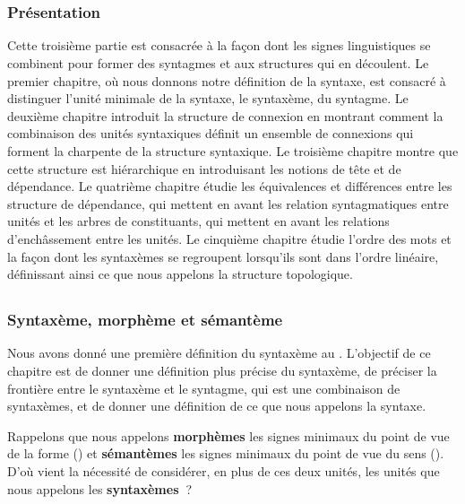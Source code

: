 \part{}\label{sec:3}

\section*{Présentation}

Cette troisième partie est consacrée à la façon dont les signes linguistiques se combinent pour former des syntagmes et aux structures qui en découlent. Le premier chapitre, où nous donnons notre définition de la syntaxe, est consacré à distinguer l’unité minimale de la syntaxe, le syntaxème, du syntagme. Le deuxième chapitre introduit la structure de connexion en montrant comment la combinaison des unités syntaxiques définit un ensemble de connexions qui forment la charpente de la structure syntaxique. Le troisième chapitre montre que cette structure est hiérarchique en introduisant les notions de tête et de dépendance. Le quatrième chapitre étudie les équivalences et différences entre les structure de dépendance, qui mettent en avant les relation syntagmatiques entre unités et les arbres de constituants, qui mettent en avant les relations d’enchâssement entre les unités. Le cinquième chapitre étudie l’ordre des mots et la façon dont les syntaxèmes se regroupent lorsqu’ils sont dans l’ordre linéaire, définissant ainsi ce que nous appelons la structure topologique.

\chapter{}\label{sec:3.1}

\section{Syntaxème, morphème et sémantème}\label{sec:3.1.0}

Nous avons donné une première définition du syntaxème au . L’objectif de ce chapitre est de donner une définition plus précise du syntaxème, de préciser la frontière entre le syntaxème et le syntagme, qui est une combinaison de syntaxèmes, et de donner une définition de ce que nous appelons la syntaxe.

Rappelons que nous appelons \textbf{morphèmes} les signes minimaux du point de vue de la forme () et \textbf{sémantèmes} les signes minimaux du point de vue du sens (). D’où vient la nécessité de considérer, en plus de ces deux unités, les unités que nous appelons les \textbf{syntaxèmes~}?

